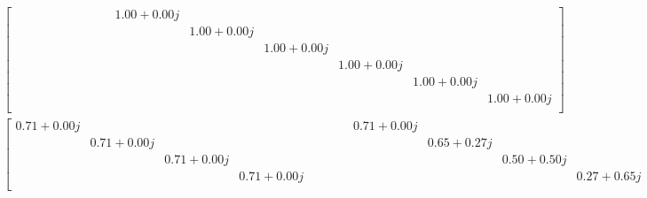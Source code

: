 \begin{gather*}
\begin{bmatrix}
            &            &            &            &            &            &            &            &            &            & 1.00+0.00j &            &            &            &            &            \\
            &            &            &            &            &            &            &            &            &            &            & 1.00+0.00j &            &            &            &            \\
            &            &            &            &            &            &            &            &            &            &            &            & 1.00+0.00j &            &            &            \\
            &            &            &            &            &            &            &            &            &            &            &            &            & 1.00+0.00j &            &            \\
            &            &            &            &            &            &            &            &            &            &            &            &            &            & 1.00+0.00j &            \\
            &            &            &            &            &            &            &            &            &            &            &            &            &            &            & 1.00+0.00j \\
\end{bmatrix}\\
\begin{bmatrix}
 0.71+0.00j &            &            &            &            &            &            &            & 0.71+0.00j &            &            &            &            &            &            &            \\
            & 0.71+0.00j &            &            &            &            &            &            &            & 0.65+0.27j &            &            &            &            &            &            \\
            &            & 0.71+0.00j &            &            &            &            &            &            &            & 0.50+0.50j &            &            &            &            &            \\
            &            &            & 0.71+0.00j &            &            &            &            &            &            &            & 0.27+0.65j &            &            &            &            \\

\end{bmatrix}
\end{gather*}
